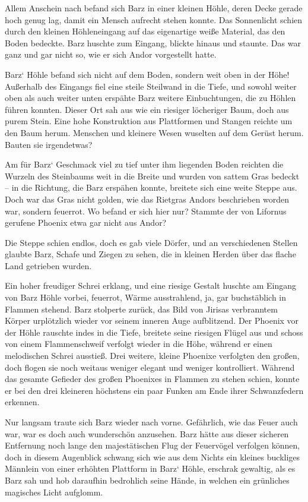 Allem Anschein nach befand sich Barz in einer kleinen Höhle, deren Decke gerade hoch genug lag, damit ein Mensch aufrecht stehen konnte. Das Sonnenlicht schien durch den kleinen Höhleneingang auf das eigenartige weiße Material, das den Boden bedeckte. Barz huschte zum Eingang, blickte hinaus und staunte. Das war ganz und gar nicht so, wie er sich Andor vorgestellt hatte.

Barz‘ Höhle befand sich nicht auf dem Boden, sondern weit oben in der Höhe! Außerhalb des Eingangs fiel eine steile Steilwand in die Tiefe, und sowohl weiter oben als auch weiter unten erspähte Barz weitere Einbuchtungen, die zu Höhlen führen konnten. Dieser Ort sah aus wie ein riesiger löcheriger Baum, doch aus purem Stein. Eine hohe Konstruktion aus Plattformen und Stangen reichte um den Baum herum. Menschen und kleinere Wesen wuselten auf dem Gerüst herum. Bauten sie irgendetwas?

Am für Barz‘ Geschmack viel zu tief unter ihm liegenden Boden reichten die Wurzeln des Steinbaums weit in die Breite und wurden von sattem Gras bedeckt – in die Richtung, die Barz erspähen konnte, breitete sich eine weite Steppe aus. Doch war das Gras nicht golden, wie das Rietgras Andors beschrieben worden war, sondern feuerrot. Wo befand er sich hier nur? Stammte der von Lifornus gerufene Phoenix etwa gar nicht aus Andor?

Die Steppe schien endlos, doch es gab viele Dörfer, und an verschiedenen Stellen glaubte Barz, Schafe und Ziegen zu sehen, die in kleinen Herden über das flache Land getrieben wurden.

Ein hoher freudiger Schrei erklang, und eine riesige Gestalt huschte am Eingang von Barz Höhle vorbei, feuerrot, Wärme ausstrahlend, ja, gar buchstäblich in Flammen stehend. Barz stolperte zurück, das Bild von Jirisas verbranntem Körper urplötzlich wieder vor seinem inneren Auge aufblitzend. Der Phoenix vor der Höhle rauschte indes in die Tiefe, breitete seine riesigen Flügel aus und schoss von einem Flammenschweif verfolgt wieder in die Höhe, während er einen melodischen Schrei ausstieß. Drei weitere, kleine Phoenixe verfolgten den großen, doch flogen sie noch weitaus weniger elegant und weniger kontrolliert. Während das gesamte Gefieder des großen Phoenixes in Flammen zu stehen schien, konnte er bei den drei kleineren höchstens ein paar Funken am Ende ihrer Schwanzfedern erkennen.

Nur langsam traute sich Barz wieder nach vorne. Gefährlich, wie das Feuer auch war, war es doch auch wunderschön anzusehen. Barz hätte aus dieser sicheren Entfernung noch lange den majestätischen Flug der Feuervögel verfolgen können, doch in diesem Augenblick schwang sich wie aus dem Nichts ein kleines buckliges Männlein von einer erhöhten Plattform in Barz‘ Höhle, erschrak gewaltig, als es Barz sah und hob daraufhin bedrohlich seine Hände, in welchen ein grünliches magisches Licht aufglomm.

